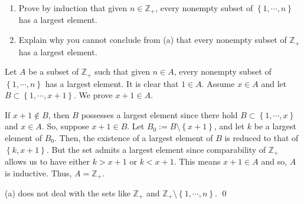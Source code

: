 \documentclass[a4paper,12pt]{article}
\begin{document}
\begin{exe}\leavevmode \par
	\begin{enumerate}
		\item
		      Prove by induction that given \( n \in \mathbb{Z}_{+} \), 
		      every nonempty subset of \( \left\{ 1,\cdots, n \right\} \) has a largest element.
		      
		\item
		      Explain why you cannot conclude from (a) that
		      every nonempty subset of \( \mathbb{Z}_{+} \)
		      has a largest element.
	\end{enumerate}
\end{exe}\begin{sol}\leavevmode \par
	Let 
	\( A \)
	be a subset of
	\( \mathbb{Z}_{+} \)
	such that
	given
	\( n \in A \),
	every nonempty subset of
	\( \left\{ 1,\cdots,n  \right\}\)
	has a largest element.
	It is clear that
	\( 1\in A \).
	Assume
	\(  x \in A \)
	and let
	\( B \subset \left\{ 1,\cdots,x+1 \right\} \).
	We prove
	\(  x+1 \in A \).
	
	If
	\( x+1 \notin B \),
	then
	\( B \)
	possesses a largest element
	since there hold
	\( B \subset \left\{ 1,\cdots,x \right\} \)
	and
	\( x\in A \).
	So, suppose
	\( x+1 \in B \).
	Let
	\( B_0:=B\setminus \left\{ x+1 \right\} \),
	and let
	\( k \) be a largest element of 
	\( B_0 \).
	Then, the existence of a largest element of 
	\( B \)
	is reduced to that of
	\( \left\{ k,x+1 \right\}\).
	But the set admits a largest element since comparability of
	\( \mathbb{Z}_{+} \)
	allows us to have either
	\( k> x+1 \)
	or
	\( k< x+1 \).
	This means 
	\( x+1 \in A \)
	and so, 
	\( A \)
	is inductive.
	Thus,
	\( A = \mathbb{Z}_{+} \).
	
	(a) does not deal with the sets like
	\( \mathbb{Z}_{+} \)
	and
	\( \mathbb{Z}_{+} \setminus \left\{ 1,\cdots,n \right\}\).
	\qed\end{sol}
\end{document}
